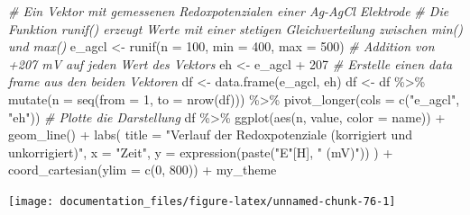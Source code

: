 \documentclass[
]{article}
\newenvironment{Shaded}{\begin{snugshade}}{\end{snugshade}}
\newcommand{\AttributeTok}[1]{\textcolor[rgb]{0.77,0.63,0.00}{#1}}
\newcommand{\CommentTok}[1]{\textcolor[rgb]{0.56,0.35,0.01}{\textit{#1}}}
\newcommand{\DecValTok}[1]{\textcolor[rgb]{0.00,0.00,0.81}{#1}}
\newcommand{\FunctionTok}[1]{\textcolor[rgb]{0.00,0.00,0.00}{#1}}
\newcommand{\NormalTok}[1]{#1}
\newcommand{\OtherTok}[1]{\textcolor[rgb]{0.56,0.35,0.01}{#1}}
\newcommand{\SpecialCharTok}[1]{\textcolor[rgb]{0.00,0.00,0.00}{#1}}
\newcommand{\StringTok}[1]{\textcolor[rgb]{0.31,0.60,0.02}{#1}}
\begin{document}
\begin{Shaded}
\begin{Highlighting}[]
\CommentTok{\# Ein Vektor mit gemessenen Redoxpotenzialen einer Ag{-}AgCl Elektrode}
\CommentTok{\# Die Funktion \textasciigrave{}runif()\textasciigrave{} erzeugt Werte mit einer stetigen Gleichverteilung zwischen min() und max()}
\NormalTok{e\_agcl }\OtherTok{\textless{}{-}} \FunctionTok{runif}\NormalTok{(}\AttributeTok{n =} \DecValTok{100}\NormalTok{, }\AttributeTok{min =} \DecValTok{400}\NormalTok{, }\AttributeTok{max =} \DecValTok{500}\NormalTok{)}
\CommentTok{\# Addition von +207 mV auf jeden Wert des Vektors }
\NormalTok{eh }\OtherTok{\textless{}{-}}\NormalTok{ e\_agcl }\SpecialCharTok{+} \DecValTok{207}
\CommentTok{\# Erstelle einen data frame aus den beiden Vektoren }
\NormalTok{df }\OtherTok{\textless{}{-}} \FunctionTok{data.frame}\NormalTok{(e\_agcl, eh) }
\NormalTok{df }\OtherTok{\textless{}{-}}\NormalTok{ df }\SpecialCharTok{\%\textgreater{}\%}
    \FunctionTok{mutate}\NormalTok{(}\AttributeTok{n =} \FunctionTok{seq}\NormalTok{(}\AttributeTok{from =} \DecValTok{1}\NormalTok{, }\AttributeTok{to =} \FunctionTok{nrow}\NormalTok{(df))) }\SpecialCharTok{\%\textgreater{}\%} 
    \FunctionTok{pivot\_longer}\NormalTok{(}\AttributeTok{cols =} \FunctionTok{c}\NormalTok{(}\StringTok{"e\_agcl"}\NormalTok{, }\StringTok{"eh"}\NormalTok{))}
\CommentTok{\# Plotte die Darstellung}
\NormalTok{df }\SpecialCharTok{\%\textgreater{}\%}
    \FunctionTok{ggplot}\NormalTok{(}\FunctionTok{aes}\NormalTok{(n, value, }\AttributeTok{color =}\NormalTok{ name)) }\SpecialCharTok{+}
    \FunctionTok{geom\_line}\NormalTok{() }\SpecialCharTok{+}
    \FunctionTok{labs}\NormalTok{(}
        \AttributeTok{title =} \StringTok{"Verlauf der Redoxpotenziale (korrigiert und unkorrigiert)"}\NormalTok{, }
        \AttributeTok{x =} \StringTok{"Zeit"}\NormalTok{, }
        \AttributeTok{y =} \FunctionTok{expression}\NormalTok{(}\FunctionTok{paste}\NormalTok{(}\StringTok{"E"}\NormalTok{[H], }\StringTok{" (mV)"}\NormalTok{))}
\NormalTok{    ) }\SpecialCharTok{+}
    \FunctionTok{coord\_cartesian}\NormalTok{(}\AttributeTok{ylim =} \FunctionTok{c}\NormalTok{(}\DecValTok{0}\NormalTok{, }\DecValTok{800}\NormalTok{)) }\SpecialCharTok{+}
\NormalTok{    my\_theme}
\end{Highlighting}
\end{Shaded}

\begin{center}\texttt{[image: documentation\_files/figure-latex/unnamed-chunk-76-1]} \end{center}
\end{document}

